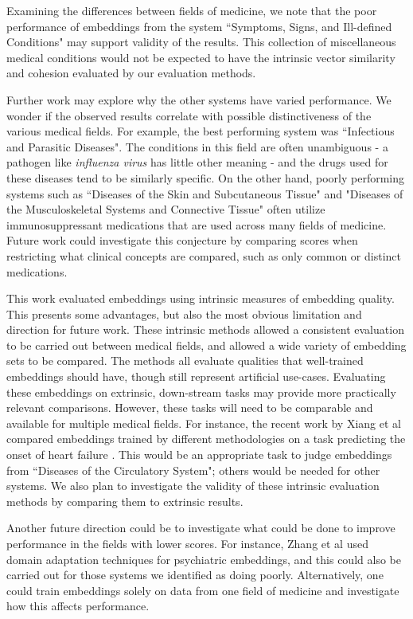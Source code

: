 \documentclass[11pt,a4paper]{article}
\begin{document}
Examining the differences between fields of medicine, we note that the poor performance of embeddings from the system ``Symptoms, Signs, and Ill-defined Conditions" may support validity of the results. This collection of miscellaneous medical conditions would not be expected to have the intrinsic vector similarity and cohesion evaluated by our evaluation methods.   

Further work may explore why the other systems have varied performance. We wonder if the observed results correlate with possible distinctiveness of the various medical fields. For example, the best performing system was ``Infectious and Parasitic Diseases". The conditions in this field are often unambiguous - a pathogen like \emph{influenza virus} has little other meaning - and the drugs used for these diseases tend to be similarly specific. On the other hand,  poorly performing systems such as ``Diseases of the Skin and Subcutaneous Tissue" and "Diseases of the Musculoskeletal Systems and Connective Tissue" often utilize immunosuppressant medications that are used across many fields of medicine. Future work could investigate this conjecture by comparing scores when restricting what clinical concepts are compared, such as only common or distinct medications. 

This work evaluated embeddings using intrinsic measures of embedding quality. This presents some advantages, but also the most obvious limitation and direction for future work. These intrinsic methods allowed a consistent evaluation to be carried out between medical fields, and allowed a wide variety of embedding sets to be compared. The methods all evaluate qualities that well-trained embeddings should have, though still represent artificial use-cases. Evaluating these embeddings on extrinsic, down-stream tasks may provide more practically relevant comparisons. However, these tasks will need to be comparable and available for multiple medical fields. For instance, the recent work by Xiang et al  compared embeddings trained by different methodologies on a task predicting the onset of heart failure \cite{rasmyStudyGeneralizabilityRecurrent2018}. This would be an appropriate task to judge embeddings from ``Diseases of the Circulatory System";  others would be needed for other systems. We also plan to investigate the validity of these intrinsic evaluation methods by comparing them to extrinsic results. 

Another future direction could be to investigate what could be done to improve performance in the fields with lower scores. For instance, Zhang et al  used domain adaptation techniques for psychiatric embeddings, and this could also be carried out for those systems we identified as doing poorly. Alternatively, one could train embeddings solely on data from one field of medicine and investigate how this affects performance. 
\end{document}

